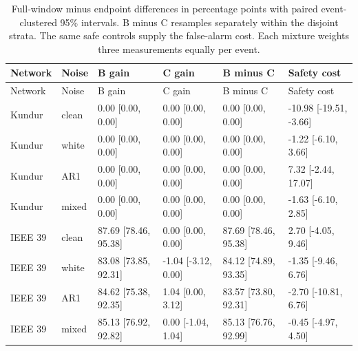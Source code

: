 \documentclass[10pt]{article}
\begin{document}
\begin{longtable}{@{}llllll@{}}
\caption{Full-window minus endpoint differences in percentage points with paired event-clustered 95\% intervals. B minus C resamples separately within the disjoint strata. The same safe controls supply the false-alarm cost. Each mixture weights three measurements equally per event.}\label{tab:interaction}\\
\toprule Network & Noise & B gain & C gain & B minus C & Safety cost \\\midrule\endfirsthead
\toprule Network & Noise & B gain & C gain & B minus C & Safety cost \\\midrule\endhead
Kundur & clean & 0.00 [0.00, 0.00] & 0.00 [0.00, 0.00] & 0.00 [0.00, 0.00] & -10.98 [-19.51, -3.66] \\
Kundur & white & 0.00 [0.00, 0.00] & 0.00 [0.00, 0.00] & 0.00 [0.00, 0.00] & -1.22 [-6.10, 3.66] \\
Kundur & AR1 & 0.00 [0.00, 0.00] & 0.00 [0.00, 0.00] & 0.00 [0.00, 0.00] & 7.32 [-2.44, 17.07] \\
Kundur & mixed & 0.00 [0.00, 0.00] & 0.00 [0.00, 0.00] & 0.00 [0.00, 0.00] & -1.63 [-6.10, 2.85] \\
IEEE 39 & clean & 87.69 [78.46, 95.38] & 0.00 [0.00, 0.00] & 87.69 [78.46, 95.38] & 2.70 [-4.05, 9.46] \\
IEEE 39 & white & 83.08 [73.85, 92.31] & -1.04 [-3.12, 0.00] & 84.12 [74.89, 93.35] & -1.35 [-9.46, 6.76] \\
IEEE 39 & AR1 & 84.62 [75.38, 92.35] & 1.04 [0.00, 3.12] & 83.57 [73.80, 92.31] & -2.70 [-10.81, 6.76] \\
IEEE 39 & mixed & 85.13 [76.92, 92.82] & 0.00 [-1.04, 1.04] & 85.13 [76.76, 92.99] & -0.45 [-4.97, 4.50] \\
\bottomrule\end{longtable}\endgroup\begingroup\footnotesize\setlength{\tabcolsep}{4pt}
\end{document}
